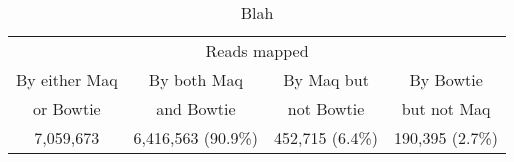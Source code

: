 \documentclass[letterpaper]{article}
\begin{document}
\begin{table}[tp]
\scriptsize
\begin{tabular}{cccc}
\multicolumn{4}{c}{Reads mapped} \\[3pt] 
By either Maq & By both Maq & By Maq but & By Bowtie   \\ 
or Bowtie     & and Bowtie  & not Bowtie & but not Maq \\ 
\toprule
7,059,673 & 6,416,563 (90.9\%) & 452,715 (6.4\%) & 190,395 (2.7\%) \\ 
\bottomrule
\end{tabular}
\caption{Blah}
\end{table}
\end{document}
